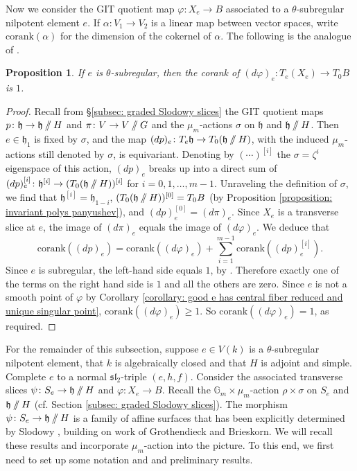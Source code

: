 \documentclass{article} %
\newtheorem{proposition}{Proposition}[section]
\numberwithin{equation}{section}
\theoremstyle{definition}
\newcommand{\G}{\mathbb{G}}
\newcommand{\GIT}{\mathbin{/\mkern-6mu/}}
\newcommand{\frakh}{\mathfrak h}
\newcommand{\fraksl}{\mathfrak{sl}}
\begin{document}
Now we consider the GIT quotient map $\varphi\colon X_e\rightarrow B$ associated to a $\theta$-subregular nilpotent element $e$.
If $\alpha \colon V_1\rightarrow V_2$ is a linear map between vector spaces, write $\mathrm{corank}(\alpha)$ for the dimension of the cokernel of $\alpha$.
The following is the analogue of \cite[Proposition 3.10]{Thorne-thesis}.
\begin{proposition}\label{proposition: corank theta-subregular slice is 1}
If $e$ is $\theta$-subregular, then the corank of $(d\varphi)_e\colon T_e(X_e)\rightarrow T_0B$ is $1$.
\end{proposition}
\begin{proof}
    Recall from \S\ref{subsec: graded Slodowy slices} the GIT quotient maps $p\colon \frakh \rightarrow \frakh \GIT H$ and $\pi\colon V\rightarrow V\GIT G$ and the $\mu_m$-actions $\sigma$ on $\frakh$ and $\frakh\GIT H$.
    Then $e\in \frakh_1$ is fixed by $\sigma$, and the map $(dp)_e\colon T_e\frakh \rightarrow T_0(\frakh\GIT H)$, with the induced $\mu_m$-actions still denoted by $\sigma$, is equivariant.
    Denoting by $(\cdots)^{[i]}$ the $\sigma = \zeta^i$ eigenspace of this action, $(dp)_e$ breaks up into a direct sum of $(dp)_e^{[i]}\colon \frakh^{[i]} \rightarrow (T_0(\frakh\GIT H))^{[i]}$ for $i=0,1, \dots, m-1$.
    Unraveling the definition of $\sigma$, we find that $\frakh^{[i]}= \frakh_{1-i}$, $(T_0(\frakh\GIT H))^{[0]} = T_0B$ (by Proposition \ref{proposition: invariant polys panyushev}), and $(dp)_e^{[0]} = (d\pi)_e$.
    Since $X_e$ is a transverse slice at $e$, the image of $(d\pi)_e$ equals the image of $(d\varphi)_e$.
    We deduce that
    \[
    \mathrm{corank}((dp)_e)=
    \mathrm{corank}((d\varphi)_e)+
    \sum_{i=1}^{m-1} \mathrm{corank}((dp)_e^{[i]}).
    \]
    Since $e$ is subregular, the left-hand side equals $1$, by \cite[Section 8.3, Proposition 1]{Slodowy-simplesingularitiesalggroups}.
    Therefore exactly one of the terms on the right hand side is $1$ and all the others are zero.
    Since $e$ is not a smooth point of $\varphi$ by Corollary \ref{corollary: good e has central fiber reduced and unique singular point}, $\mathrm{corank}((d\varphi)_e)\geq 1$. 
    So $\mathrm{corank}((d\varphi)_e)=1$, as required.
\end{proof}


For the remainder of this subsection, suppose $e\in V(k)$ is a $\theta$-subregular nilpotent element, that $k$ is algebraically closed and that $H$ is adjoint and simple.
Complete $e$ to a normal $\fraksl_2$-triple $(e,h,f)$.
Consider the associated transverse slices $\psi\colon S_e \rightarrow \frakh\GIT H$ and $\varphi\colon X_e\rightarrow B$.
Recall the $\G_m \times \mu_m$-action $\rho\times \sigma$ on $S_e$ and $\frakh\GIT H$ (cf. Section \ref{subsec: graded Slodowy slices}).
The morphism $\psi\colon S_e\rightarrow \frakh\GIT H$ is a family of affine surfaces that has been explicitly determined by Slodowy \cite{Slodowy-simplesingularitiesalggroups}, building on work of Grothendieck and Brieskorn.
We will recall these results and incorporate $\mu_m$-action into the picture.
To this end, we first need to set up some notation and and preliminary results.
\end{document}
